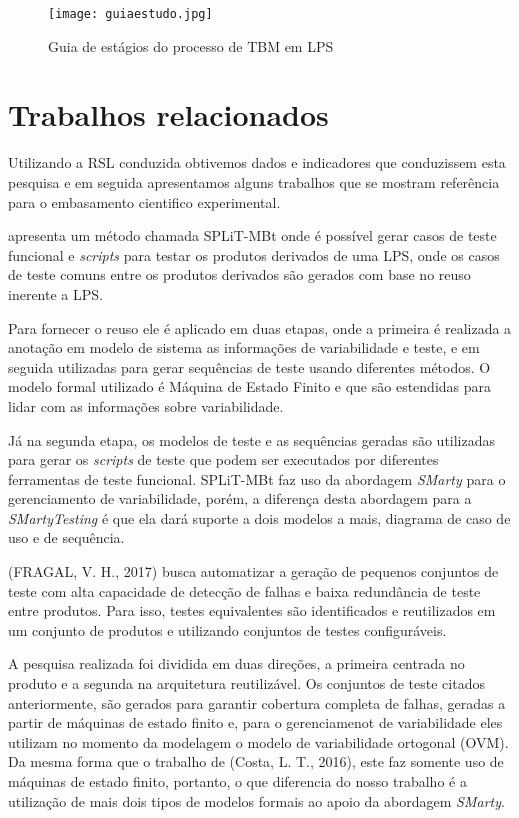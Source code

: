 \begin{landscape}
	
	\begin{figure}[htb]
		\centering
		\caption{Guia de estágios do processo de TBM em LPS}
		\texttt{[image: guiaestudo.jpg]}
		\label{fig:guiaestudoquali}
	\end{figure}
	
\end{landscape}


\section{Trabalhos relacionados}
\label{sec:conc_basi}
Utilizando a RSL conduzida obtivemos dados e indicadores que conduzissem esta pesquisa e em seguida apresentamos alguns trabalhos que se mostram referência para o embasamento cientifico experimental.

\cite{costa2016split} apresenta um método chamada SPLiT-MBt onde é possível gerar casos de teste funcional e \textit{scripts} para testar os produtos derivados de uma LPS, onde os casos de teste comuns entre os produtos derivados são gerados com base no reuso inerente a LPS.

Para fornecer o reuso ele é aplicado em duas etapas, onde a primeira é realizada a anotação em modelo de sistema as informações de variabilidade e teste, e em seguida utilizadas para gerar sequências de teste usando diferentes métodos. O modelo formal utilizado é Máquina de Estado Finito e que são estendidas para lidar com as informações sobre variabilidade.

Já na segunda etapa, os modelos de teste e as sequências geradas são utilizadas para gerar os \textit{scripts} de teste que podem ser executados por diferentes ferramentas de teste funcional. SPLiT-MBt faz uso da abordagem \textit{SMarty} para o gerenciamento de variabilidade, porém, a diferença desta abordagem para a \textit{SMartyTesting} é que ela dará suporte a dois modelos a mais, diagrama de caso de uso e de sequência.

(FRAGAL, V. H., 2017) busca automatizar a geração de pequenos conjuntos de teste com alta capacidade de detecção de falhas e baixa redundância de teste entre produtos. Para isso, testes equivalentes são identificados e reutilizados em um conjunto de produtos e utilizando conjuntos de testes configuráveis.

A pesquisa realizada foi dividida em duas direções, a primeira centrada no produto e a segunda na arquitetura reutilizável. Os conjuntos de teste citados anteriormente, são gerados para garantir cobertura completa de falhas, geradas a partir de máquinas de estado finito e, para o gerenciamenot de variabilidade eles utilizam no momento da modelagem o modelo de variabilidade ortogonal (OVM). Da mesma forma que o trabalho de (Costa, L. T., 2016), este faz somente uso de máquinas de estado finito, portanto, o que diferencia do nosso trabalho é a utilização de mais dois tipos de modelos formais ao apoio da abordagem \textit{SMarty}.

